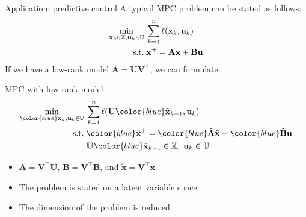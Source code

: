 \documentclass[10pt]{beamer}
\newcommand{\blue}{\color{blue}}
\newcommand{\bx}{\mathbf{x}}
\newcommand{\bX}{\mathbf{X}}
\newcommand{\bY}{\mathbf{Y}}
\newcommand{\bA}{\mathbf{A}}
\newcommand{\bB}{\mathbf{B}}
\newcommand{\bu}{\mathbf{u}}
\newcommand{\bU}{\mathbf{U}}
\newcommand{\bV}{\mathbf{V}}
\newcommand{\rank}{\mathop{\textrm{\textup{rank}}}}
\newcommand{\st}{\mathop{\textrm{\textup{s.t.}}}}
\begin{document}
\begin{frame}{Application: predictive control}
  A typical MPC problem can be stated as follows.
  \begin{align*}
    \min_{\bx_k\in\mathbb{X},\bu_k\in\mathbb{U}}\;& \sum_{k=1}^n \ell(\bx_k,\bu_k)\\
    \st\;&\bx^+ = \bA\bx + \bB\bu
  \end{align*}
  If we have a low-rank model  $\bA=\bU\bV^\top$, we can formulate:

  \begin{block}{MPC with low-rank model}
    \vspace{-0.15in}
    \begin{align*}
    \min_{{\blue \tilde{\bx}_k},\bu_k\in\mathbb{U}}\;& \sum_{k=1}^n \ell(\bU{\blue\tilde{\bx}_{k-1}},\bu_k)\\
    \st\;&{\blue\tilde{\bx}^+} = {\blue\tilde{\bA}\tilde{\bx}} + {\blue \tilde{\bB}}\bu \\
    &\bU{\blue\tilde{\bx}_{k-1}}\in\mathbb{X},\;\bu_k\in\mathbb{U}
    \end{align*}
  \end{block}
  \begin{itemize}
  \item $\tilde{\bA}=\bV^\top\bU$, $\tilde{\bB}=\bV^\top\bB$, and $\tilde{\bx}=\bV^\top \bx$
    \vspace{0.1in}
  \item The problem is stated on a {\blue latent variable space}.
    \vspace{0.1in}
  \item The dimension of the problem is reduced.
  \end{itemize}
\end{frame}
\end{document}
